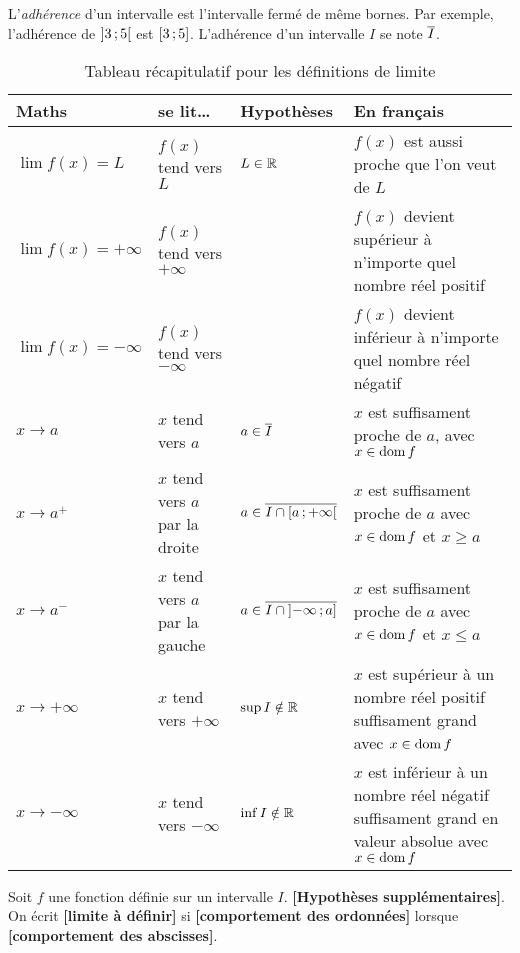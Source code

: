 \documentclass[main.tex]{subfiles}
\begin{document}
L'\emph{adhérence} d'un intervalle est l'intervalle fermé de même bornes.
Par exemple, l'adhérence de $\mathopen{]}3\,;5\mathclose{[}$ est $\mathopen{[}3\,;5\mathclose{]}$.
L'adhérence d'un intervalle $I$ se note $\overline{I}$.

\begin{sidewaystable}
    \centering
    \caption{Tableau récapitulatif pour les définitions de limite}
    \label{table:limit_definition}
    \begin{tabular}
        {l l l l}
        \toprule
        Maths & se lit\dots & Hypothèses & En français \\ \midrule
        $\lim f(x) = L$ & $f(x)$ tend vers $L$ & $L \in \mathbb{R}$ & $f(x)$ est aussi proche que l'on veut de $L$ \\
        $\lim f(x) = +\infty$ & $f(x)$ tend vers $+\infty$ & & $f(x)$ devient supérieur à n'importe quel nombre réel positif\\
        $\lim f(x) = -\infty$ & $f(x)$ tend vers $-\infty$ & & $f(x)$ devient inférieur à n'importe quel nombre réel négatif\\
        $x \to a$ & $x$ tend vers $a$ & $a \in \overline{I}$ & $x$ est suffisament proche de $a$, avec $x \in \operatorname{dom} f$\\
        $x \to a^+$ & $x$ tend vers $a$ par la droite & $a \in \overline{I \cap \mathopen{[}a\,;+\infty\mathclose{[}}$ & $x$ est suffisament proche de $a$ avec $x \in \operatorname{dom} f$ et $x \geq a$\\
        $x \to a^-$ & $x$ tend vers $a$ par la gauche & $a \in \overline{I \cap \mathopen{]}-\infty\,;a\mathclose{]}}$ & $x$ est suffisament proche de $a$ avec $x \in \operatorname{dom} f$ et $x \leq a$\\
        $x \to +\infty$ & $x$ tend vers $+\infty$ & $\sup I \notin \mathbb{R}$ & $x$ est supérieur à un nombre réel positif suffisament grand avec $x \in \operatorname{dom} f$\\
        $x \to -\infty$ & $x$ tend vers $-\infty$ & $\inf I \notin \mathbb{R}$ & $x$ est inférieur à un nombre réel négatif suffisament grand en valeur absolue avec $x \in \operatorname{dom} f$\\
        \bottomrule
    \end{tabular}
\end{sidewaystable}

\begin{definition}
    [Limite]

    Soit $f$ une fonction définie sur un intervalle $I$.
    \textbf{[Hypothèses supplémentaires]}.
    On écrit \textbf{[limite à définir]}
    si \textbf{[comportement des ordonnées]}
    lorsque \textbf{[comportement des abscisses]}.
\end{definition}
\end{document}
